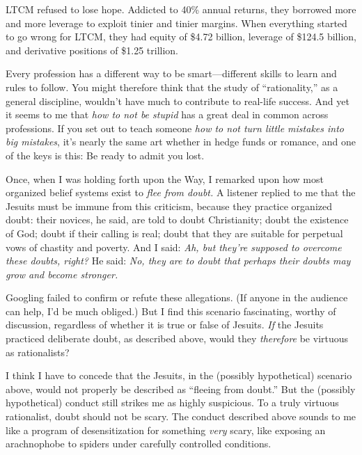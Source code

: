 {
 LTCM refused to lose hope. Addicted to 40\% annual returns, they
borrowed more and more leverage to exploit tinier and tinier margins.
When everything started to go wrong for LTCM, they had equity of \$4.72
billion, leverage of \$124.5 billion, and derivative positions of
\$1.25 trillion.}

{
 Every profession has a different way to be smart---different
skills to learn and rules to follow. You might therefore think that the
study of ``rationality,'' as a
general discipline, wouldn't have much to contribute to
real-life success. And yet it seems to me that \textit{how to not be
stupid} has a great deal in common across professions. If you set out
to teach someone \textit{how to not turn little mistakes into big
mistakes}, it's nearly the same art whether in hedge
funds or romance, and one of the keys is this: Be ready to admit you
lost.}

\myendsectiontext


{
 Once, when I was holding forth upon the Way, I remarked upon how
most organized belief systems exist to \textit{flee from doubt.} A
listener replied to me that the Jesuits must be immune from this
criticism, because they practice organized doubt: their novices, he
said, are told to doubt Christianity; doubt the existence of God; doubt
if their calling is real; doubt that they are suitable for perpetual
vows of chastity and poverty. And I said: \textit{Ah, but
they're supposed to overcome these doubts, right?} He
said: \textit{No, they are to doubt that perhaps their doubts may grow
and become stronger.} }

{
 Googling failed to confirm or refute these allegations. (If anyone
in the audience can help, I'd be much obliged.) But I
find this scenario fascinating, worthy of discussion, regardless of
whether it is true or false of Jesuits. \textit{If} the Jesuits
practiced deliberate doubt, as described above, would they
\textit{therefore} be virtuous as rationalists?}

{
 I think I have to concede that the Jesuits, in the (possibly
hypothetical) scenario above, would not properly be described as
``fleeing from doubt.'' But the
(possibly hypothetical) conduct still strikes me as highly suspicious.
To a truly virtuous rationalist, doubt should not be scary. The conduct
described above sounds to me like a program of desensitization for
something \textit{very} scary, like exposing an arachnophobe to spiders
under carefully controlled conditions.}

